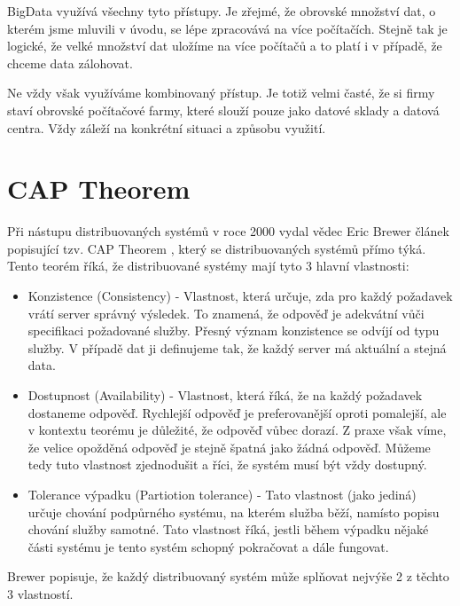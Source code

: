 BigData využívá všechny tyto přístupy. Je zřejmé, že obrovské množství dat, o kterém jsme mluvili v úvodu, se lépe zpracovává na více počítačích. Stejně tak je logické, že velké množství dat uložíme na více počítačů a to platí i v případě, že chceme data zálohovat. 

Ne vždy však využíváme kombinovaný přístup. Je totiž velmi časté, že si firmy staví obrovské počítačové farmy, které slouží pouze jako datové sklady a datová centra. Vždy záleží na konkrétní situaci a způsobu využití. 


\section{CAP Theorem}
 Při nástupu distribuovaných systémů v roce 2000 vydal vědec Eric Brewer článek popisující tzv. CAP Theorem \cite{cap}, který se distribuovaných systémů přímo týká. Tento teorém říká, že distribuované systémy mají tyto 3 hlavní vlastnosti: 

\begin{itemize}
\item Konzistence (Consistency) - Vlastnost, která určuje, zda pro každý požadavek vrátí server správný výsledek. To znamená, že odpověď je adekvátní vůči specifikaci požadované služby. Přesný význam konzistence se odvíjí od typu služby. V případě dat ji definujeme tak, že každý server má aktuální a stejná data.

\item Dostupnost (Availability) - Vlastnost, která říká, že na každý požadavek dostaneme odpověď. Rychlejší odpověď je preferovanější oproti pomalejší, ale v kontextu teorému je důležité, že odpověď vůbec dorazí. Z praxe však víme, že velice opožděná odpověď je stejně špatná jako žádná odpověď. Můžeme tedy tuto vlastnost zjednodušit a říci, že systém musí být vždy dostupný.

\item Tolerance výpadku (Partiotion tolerance) - Tato vlastnost (jako jediná) určuje chování podpůrného systému, na kterém služba běží, namísto popisu chování služby samotné. Tato vlastnost říká, jestli během výpadku nějaké části systému je tento systém schopný pokračovat a dále fungovat.

\end{itemize}


Brewer popisuje, že každý distribuovaný systém může splňovat nejvýše 2 z těchto 3 vlastností.

